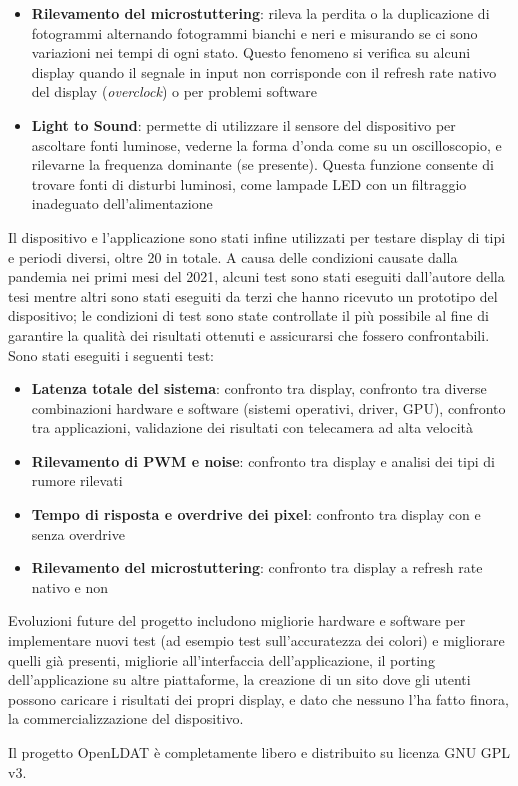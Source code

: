 \documentclass[a4paper]{article}
\begin{document}
\begin{itemize}
	\item \textbf{Rilevamento del microstuttering}: rileva la perdita o la duplicazione di fotogrammi alternando fotogrammi bianchi e neri e misurando se ci sono variazioni nei tempi di ogni stato. Questo fenomeno si verifica su alcuni display quando il segnale in input non corrisponde con il refresh rate nativo del display (\textit{overclock}) o per problemi software
	\item \textbf{Light to Sound}: permette di utilizzare il sensore del dispositivo per ascoltare fonti luminose, vederne la forma d'onda come su un oscilloscopio, e rilevarne la frequenza dominante (se presente). Questa funzione consente di trovare fonti di disturbi luminosi, come lampade LED con un filtraggio inadeguato dell'alimentazione
\end{itemize}

Il dispositivo e l'applicazione sono stati infine utilizzati per testare display di tipi e periodi diversi, oltre 20 in totale. A causa delle condizioni causate dalla pandemia nei primi mesi del 2021, alcuni test sono stati eseguiti dall'autore della tesi mentre altri sono stati eseguiti da terzi che hanno ricevuto un prototipo del dispositivo; le condizioni di test sono state controllate il più possibile al fine di garantire la qualità dei risultati ottenuti e assicurarsi che fossero confrontabili. Sono stati eseguiti i seguenti test:\begin{itemize}
	\item \textbf{Latenza totale del sistema}: confronto tra display, confronto tra diverse combinazioni hardware e software (sistemi operativi, driver, GPU), confronto tra applicazioni, validazione dei risultati con telecamera ad alta velocità
	\item \textbf{Rilevamento di PWM e noise}: confronto tra display e analisi dei tipi di rumore rilevati
	\item \textbf{Tempo di risposta e overdrive dei pixel}: confronto tra display con e senza overdrive
	\item \textbf{Rilevamento del microstuttering}: confronto tra display a refresh rate nativo e non
\end{itemize}

Evoluzioni future del progetto includono migliorie hardware e software per implementare nuovi test (ad esempio test sull'accuratezza dei colori) e migliorare quelli già presenti, migliorie all'interfaccia dell'applicazione, il porting dell'applicazione su altre piattaforme, la creazione di un sito dove gli utenti possono caricare i risultati dei propri display, e dato che nessuno l'ha fatto finora, la commercializzazione del dispositivo.

Il progetto OpenLDAT è completamente libero e distribuito su licenza GNU GPL v3.
\end{document}
